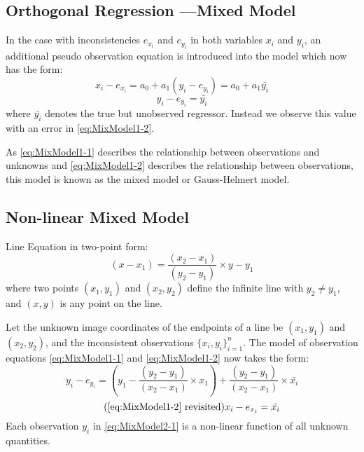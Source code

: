 \subsection{Orthogonal Regression ---Mixed Model}
\label{subsec:MixedModel}

In the case with inconsistencies $e_{x_i}$ and $e_{y_i}$ in both variables $x_i$ and $y_i$, an additional pseudo observation equation is introduced into the model which now has the form:
\begin{equation} \label{eq:MixModel1-1}
x_i - e_{x_i} = a_0 + a_1(y_i-e_{y_i}) = a_0 + a_1\bar{y_i}
\end{equation}
\begin{equation} \label{eq:MixModel1-2}
y_i-e_{y_i} = \bar{y_i}
\end{equation}
where $\bar{y_i}$ denotes the true but unobserved regressor. Instead we observe this value with an error in \eqref{eq:MixModel1-2}.

As \eqref{eq:MixModel1-1} describes the relationship between observations and unknowns and \eqref{eq:MixModel1-2} describes the relationship between observations, this model is known as the mixed model or Gauss-Helmert model.

\subsection{Non-linear Mixed Model}
\label{subsec:NonLinear}

Line Equation in two-point form:
\begin{equation} \label{eq:LineInTwoPointForm}
(x-x_1) = \dfrac{(x_2-x_1)}{(y_2-y_1)}\times y-y_1
\end{equation}
where two points $(x_1,y_1)$ and $(x_2,y_2)$ define the infinite line with $y_2\neq y_1$, and $(x,y)$ is any point on the line.

Let the unknown image coordinates of the endpoints of a line be $(x_1,y_1)$ and $(x_2,y_2)$, and the inconsistent observations $\{x_i,y_i\}^n_{i=1}$. The model of observation equations \eqref{eq:MixModel1-1} and \eqref{eq:MixModel1-2} now takes the form: 
\begin{equation} \label{eq:MixModel2-1}
y_i - e_{y_i}= (y_1-\dfrac{(y_2-y_1)}{(x_2-x_1)}\times x_1) + \dfrac{(y_2-y_1)}{(x_2-x_1)}\times \bar{x_i}
\end{equation}
\begin{equation} \tag{\ref{eq:MixModel1-2} revisited}
x_i-e_{x_i} = \bar{x_i}
\end{equation}
Each observation $y_i$ in \eqref{eq:MixModel2-1} is a non-linear function of all unknown quantities.

